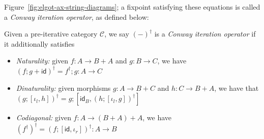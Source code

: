 \documentclass[acmsmall,screen,anonymous,review]{acmart}
\newcommand{\mc}[1]{\ensuremath{\mathcal{#1}}}
\newcommand{\ms}[1]{\ensuremath{\mathsf{#1}}}
\begin{document}
Figure~\ref{fig:elgot-ax-string-diagrams}; a fixpoint satisfying these equations is called a
\emph{Conway iteration operator}, as defined below:
\begin{definition}
  Given a pre-iterative category $\mc{C}$, we say $(-)^\dagger$ is a \emph{Conway iteration
  operator} if it additionally satisfies
  \begin{itemize}
    \item \emph{Naturality:} given $f : A \to B + A$ and $g : B \to C$, we have
      $
      (f;g + \ms{id})^\dagger = f^\dagger;g : A \to C
      $
    \item \emph{Dinaturality:} given morphisms $g : A \to B + C$ and $h : C \to B + A$, we have that
      $
      (g ; [\iota_l, h])^\dagger = g ; [\ms{id}_B, (h ; [\iota_l, g])^\dagger]
      $
    \item \emph{Codiagonal:} given $f : A \to (B + A) + A$, we have
      $
      (f^\dagger)^\dagger = (f;[\ms{id}, \iota_r])^\dagger : A \to B
      $
  \end{itemize}
\end{definition}
\end{document}
